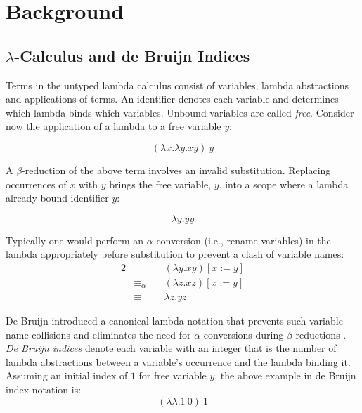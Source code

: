 \documentclass[a4paper,12pt,twoside,openright]{report}
\theoremstyle{definition}
\begin{document}
\section{Background}\label{sec:background}
\subsection{\texorpdfstring{$\lambda$}{Lg}-Calculus and de Bruijn Indices}\label{subsec:lambda}
Terms in the untyped lambda calculus consist of variables, lambda abstractions and applications of terms. An identifier denotes each variable and determines which lambda binds which variables. Unbound variables are called \textit{free}. Consider now the application of a lambda to a free variable $y$:

\begin{equation*}
    (\lambda x.\lambda y.xy)\:y
\end{equation*}

A $\beta$-reduction of the above term involves an invalid substitution. Replacing occurrences of $x$ with $y$ brings the free variable, $y$, into a scope where a lambda already bound identifier $y$:

\begin{equation*}
    \lambda y.yy
\end{equation*}

Typically one would perform an $\alpha$-conversion (i.e., rename variables) in the lambda appropriately before substitution to prevent a clash of variable names:
\begin{alignat*}{2}
                  & && \: (\lambda y.xy)[x:=y]    \\
    & \equiv_\alpha && \: (\lambda z.xz)[x:=y]    \\
    & \equiv        && \: \lambda z.yz
\end{alignat*}

De Bruijn introduced a canonical lambda notation that prevents such variable name collisions and eliminates the need for $\alpha$-conversions during $\beta$-reductions \cite{de1972lambda}. \textit{De Bruijn indices} denote each variable with an integer that is the number of lambda abstractions between a variable's occurrence and the lambda binding it. Assuming an initial index of $1$ for free variable $y$, the above example in de Bruijn index notation is:
\begin{equation*}
    (\lambda \lambda. 1 \: 0) \: 1
\end{equation*}
\end{document}
